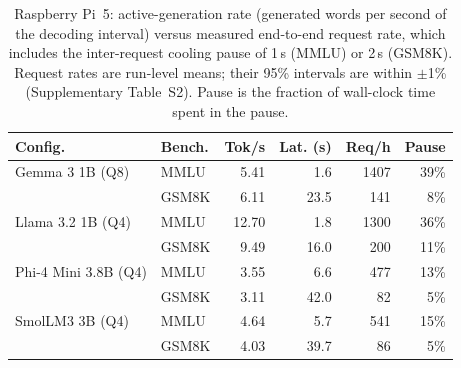 \begin{table}[!t]
\revstart\centering
\caption{Raspberry Pi~5: active-generation rate (generated words per second of the decoding interval) versus measured end-to-end request rate, which includes the inter-request cooling pause of 1\,s (MMLU) or 2\,s (GSM8K). Request rates are run-level means; their 95\% intervals are within $\pm$1\% (Supplementary Table~S2). Pause is the fraction of wall-clock time spent in the pause.}
\label{tab:pi-rates}
\footnotesize
\setlength{\tabcolsep}{2.2pt}
\begin{tabularx}{\columnwidth}{@{}L l r r r r@{}}
\toprule
\textbf{Config.} & \textbf{Bench.} & \textbf{Tok/s} & \textbf{Lat. (s)} & \textbf{Req/h} & \textbf{Pause} \\
\midrule
Gemma 3 1B (Q8) & MMLU & 5.41 & 1.6 & 1407 & 39\% \\
 & GSM8K & 6.11 & 23.5 & 141 & 8\% \\
Llama 3.2 1B (Q4) & MMLU & 12.70 & 1.8 & 1300 & 36\% \\
 & GSM8K & 9.49 & 16.0 & 200 & 11\% \\
Phi-4 Mini 3.8B (Q4) & MMLU & 3.55 & 6.6 & 477 & 13\% \\
 & GSM8K & 3.11 & 42.0 & 82 & 5\% \\
SmolLM3 3B (Q4) & MMLU & 4.64 & 5.7 & 541 & 15\% \\
 & GSM8K & 4.03 & 39.7 & 86 & 5\% \\
\bottomrule
\end{tabularx}
\end{table}
